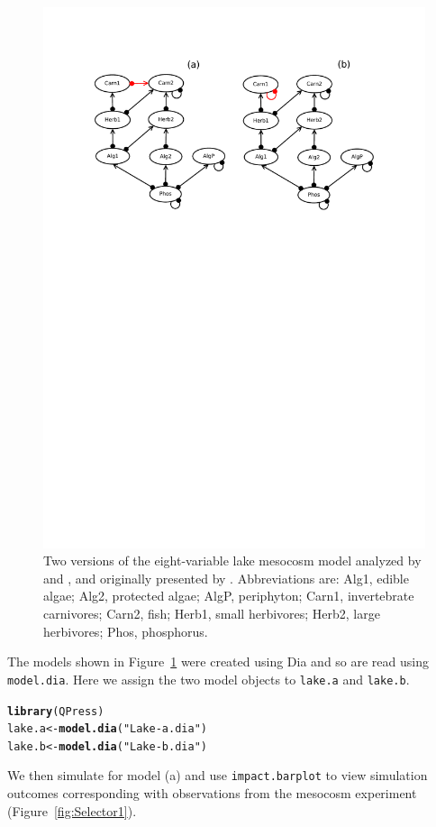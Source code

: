 \documentclass[a4paper]{article}\usepackage[]{graphicx}\usepackage[]{color}
\makeatletter
\newcommand{\hlstr}[1]{\textcolor[rgb]{0.192,0.494,0.8}{#1}}%
\newcommand{\hlstd}[1]{\textcolor[rgb]{0.345,0.345,0.345}{#1}}%
\newcommand{\hlkwb}[1]{\textcolor[rgb]{0.69,0.353,0.396}{#1}}%
\newcommand{\hlkwd}[1]{\textcolor[rgb]{0.737,0.353,0.396}{\textbf{#1}}}%
\newenvironment{kframe}{%
 \def\at@end@of@kframe{}%
 \ifinner\ifhmode%
  \def\at@end@of@kframe{\end{minipage}}%
  \begin{minipage}{\columnwidth}%
 \fi\fi%
 \def\FrameCommand##1{\hskip\@totalleftmargin \hskip-\fboxsep
 \colorbox{shadecolor}{##1}\hskip-\fboxsep
     \hskip-\linewidth \hskip-\@totalleftmargin \hskip\columnwidth}%
 \MakeFramed {\advance\hsize-\width
   \@totalleftmargin\z@ \linewidth\hsize
   \@setminipage}}%
 {\par\unskip\endMakeFramed%
 \at@end@of@kframe}
\newenvironment{knitrout}{}{} %
\makeatother
\begin{document}
\begin{figure}[ht]
  \centering
  \includegraphics{Lake.pdf}
  \caption{Two versions of the eight-variable lake mesocosm model analyzed by
  \cite{JMT2012} and \cite{Hosack2008}, and originally presented by
  \cite{Hulot2000}. Abbreviations are: Alg1, edible algae; Alg2,
  protected algae; AlgP, periphyton; Carn1,  invertebrate carnivores; Carn2,
  fish; Herb1, small herbivores; Herb2, large herbivores; Phos, phosphorus.}
  \label{fig:Lake}
\end{figure}
\vspace{1cm}

The models shown in Figure~\ref{fig:Lake} were created using Dia and so are
read using \texttt{model.dia}. Here we assign the two model objects to
\texttt{lake.a} and \texttt{lake.b}.
\begin{knitrout}
\color{fgcolor}\begin{kframe}
\begin{alltt}
\hlkwd{library}\hlstd{(QPress)}
\hlstd{lake.a} \hlkwb{<-} \hlkwd{model.dia}\hlstd{(}\hlstr{"Lake-a.dia"}\hlstd{)}
\hlstd{lake.b} \hlkwb{<-} \hlkwd{model.dia}\hlstd{(}\hlstr{"Lake-b.dia"}\hlstd{)}
\end{alltt}
\end{kframe}
\end{knitrout}
We then simulate for model (a) and use \texttt{impact.barplot} to view
simulation outcomes corresponding with observations from the mesocosm
experiment (Figure~\ref{fig:Selector1}).
\end{document}
